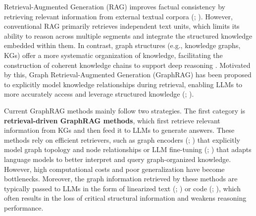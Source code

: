 \documentclass[11pt]{article}
\begin{document}
Retrieval-Augmented Generation (RAG) improves factual consistency by retrieving relevant information from external textual corpora (\citealp{asai2024selfrag}; \citealp{jeong2024adaptive}). However, conventional RAG primarily retrieves independent text units, which limits its ability to reason across multiple segments and integrate the structured knowledge embedded within them. In contrast, graph structures (e.g., knowledge graphs, KGs) offer a more systematic organization of knowledge, facilitating the construction of coherent knowledge chains to support deep reasoning \citep{liu2024lost}. Motivated by this, Graph Retrieval-Augmented Generation (GraphRAG) has been proposed to explicitly model knowledge relationships during retrieval, enabling LLMs to more accurately access and leverage structured knowledge (\citealp{edge2024local}; \citealp{wu2024medical}).

Current GraphRAG methods mainly follow two strategies. The first category is \textbf{retrieval-driven GraphRAG methods}, which first retrieve relevant information from KGs and then feed it to LLMs to generate answers. These methods rely on efficient retrievers, such as graph encoders (\citealp{mavromatis2024gnn}; \citealp{liu-etal-2024-knowledge-graph}) that explicitly model graph topology and node relationships or LLM fine-tuning (\citealp{chai2023graphllm}; \citealp{tang2024graphgpt}) that adapts language models to better interpret and query graph-organized knowledge. However, high computational costs and poor generalization have become bottlenecks. Moreover, the graph information retrieved by these methods are typically passed to LLMs in the form of linearized text (\citealp{mavromatis2024gnn}; \citealp{liu-etal-2024-knowledge-graph}) or code (\citealp{DBLP:journals/corr/abs-2408-13863}; \citealp{skianis2024graph}), which often results in the loss of critical structural information and weakens reasoning performance.
\end{document}
